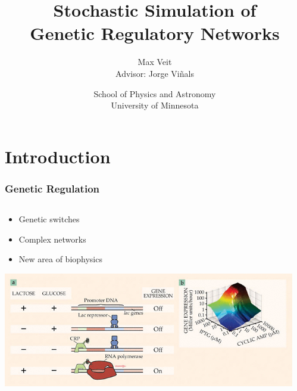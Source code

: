 \documentclass[xcolor={usenames,dvipsnames,svgnames},url=hyphens]{beamer}
\begin{document}
\title[Genetic Networks]{Stochastic Simulation of\\Genetic Regulatory Networks}
\author[Max Veit]{Max Veit\\Advisor: Jorge Viñals}
\date[2014-05-07{7 May 2014}
\institute[U of MN Physics]{School of Physics and Astronomy\\University of Minnesota}
\subject{Physics}

\frame{\titlepage}

\section{Introduction} %
\label{sec:introduction}
\begin{frame}
    \frametitle{Genetic Regulation}
    \begin{center}
    \end{center}
    \begin{columns}[c]
        \begin{column}[c]{0.7\textwidth}
            \begin{itemize}
                \item Genetic switches
                \item Complex networks
                \item New area of biophysics
            \end{itemize}
            \includegraphics[width=\textwidth]{ecoli-switch.png} \footnotesize{\cite{decision-making}}
        \end{column}
        \begin{column}[c]{0.3\textwidth}

\end{column}
\end{columns}
\end{frame}
\end{document}
